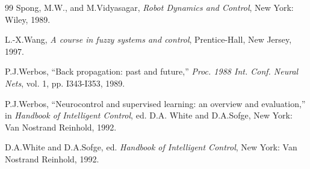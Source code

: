 \documentclass[12pt,a4paper]{ctexart}
\begin{document}
\begin{thebibliography}{99}
 Spong, M.W., and M.Vidyasagar, \textit{Robot Dynamics and Control}, New York: Wiley, 1989.

 L.-X.Wang, \textit{A course in fuzzy systems and control}, Prentice-Hall, New Jersey, 1997.

 P.J.Werbos, ``Back propagation: past and future,'' \textit{Proc. 1988 Int. Conf. Neural Nets}, vol. 1, pp. I343-I353, 1989.

 P.J.Werbos, ``Neurocontrol and supervised learning: an overview and evaluation,'' in \textit{Handbook of Intelligent Control}, ed. D.A. White and D.A.Sofge, New York: Van Nostrand Reinhold, 1992.

 D.A.White and D.A.Sofge, ed. \textit{Handbook of Intelligent Control}, New York: Van Nostrand Reinhold, 1992.

\end{thebibliography}

\ifstandalone
  
\end{document}
